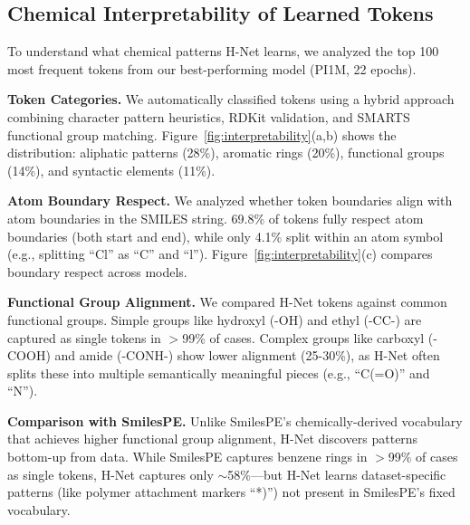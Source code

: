 
\subsection{Chemical Interpretability of Learned Tokens}

To understand what chemical patterns H-Net learns, we analyzed the top 100 most frequent tokens from our best-performing model (PI1M, 22 epochs).

\textbf{Token Categories.} We automatically classified tokens using a hybrid approach combining character pattern heuristics, RDKit validation, and SMARTS functional group matching. Figure~\ref{fig:interpretability}(a,b) shows the distribution: aliphatic patterns (28\%), aromatic rings (20\%), functional groups (14\%), and syntactic elements (11\%).

\textbf{Atom Boundary Respect.} We analyzed whether token boundaries align with atom boundaries in the SMILES string. 69.8\% of tokens fully respect atom boundaries (both start and end), while only 4.1\% split within an atom symbol (e.g., splitting ``Cl'' as ``C'' and ``l''). Figure~\ref{fig:interpretability}(c) compares boundary respect across models.

\textbf{Functional Group Alignment.} We compared H-Net tokens against common functional groups. Simple groups like hydroxyl (-OH) and ethyl (-CC-) are captured as single tokens in $>$99\% of cases. Complex groups like carboxyl (-COOH) and amide (-CONH-) show lower alignment (25-30\%), as H-Net often splits these into multiple semantically meaningful pieces (e.g., ``C(=O)'' and ``N'').

\textbf{Comparison with SmilesPE.} Unlike SmilesPE's chemically-derived vocabulary that achieves higher functional group alignment, H-Net discovers patterns bottom-up from data. While SmilesPE captures benzene rings in $>$99\% of cases as single tokens, H-Net captures only $\sim$58\%---but H-Net learns dataset-specific patterns (like polymer attachment markers ``*)'') not present in SmilesPE's fixed vocabulary.
